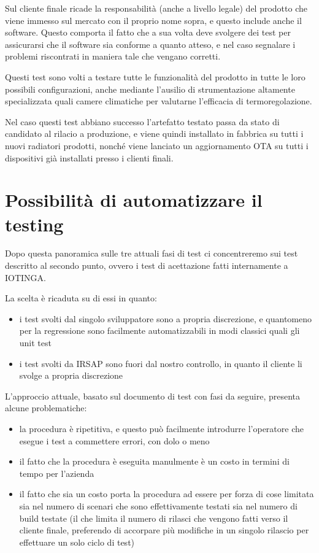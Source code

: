 \documentclass[12pt,a4paper,twoside,titlepage]{book}
\begin{document}
Sul cliente finale ricade la responsabilità (anche a livello legale) del prodotto
che viene immesso sul mercato con il proprio nome sopra, e questo include anche
il software. Questo comporta il fatto che a sua volta deve svolgere dei test per
assicurarsi che il software sia conforme a quanto atteso, e nel caso segnalare i
problemi riscontrati in maniera tale che vengano corretti.

Questi test sono volti a testare tutte le funzionalità del prodotto in tutte le loro
possibili configurazioni, anche mediante l'ausilio di strumentazione altamente
specializzata quali camere climatiche per valutarne l'efficacia di termoregolazione.

Nel caso questi test abbiano successo l'artefatto testato passa da stato di candidato
al rilacio a produzione, e viene quindi installato in fabbrica su tutti i nuovi radiatori
prodotti, nonché viene lanciato un aggiornamento OTA su tutti i dispositivi già installati
presso i clienti finali.

\section{Possibilità di automatizzare il testing}

Dopo questa panoramica sulle tre attuali fasi di test ci concentreremo sui test
descritto al secondo punto, ovvero i test di acettazione fatti internamente a IOTINGA.

La scelta è ricaduta su di essi in quanto:
\begin{itemize}
    \item i test svolti dal singolo sviluppatore sono a propria discrezione, e quantomeno
        per la regressione sono facilmente automatizzabili in modi classici quali gli unit test
    \item i test svolti da IRSAP sono fuori dal nostro controllo, in quanto il cliente
        li svolge a propria discrezione
\end{itemize}

L'approccio attuale, basato sul documento di test con fasi da seguire, presenta
alcune problematiche:
\begin{itemize}
    \item la procedura è ripetitiva, e questo può facilmente introdurre
        l'operatore che esegue i test a commettere errori, con dolo o meno
    \item il fatto che la procedura è eseguita manulmente è un costo in termini di
        tempo per l'azienda
    \item il fatto che sia un costo porta la procedura ad essere per forza di cose
        limitata sia nel numero di scenari che sono effettivamente testati sia nel
        numero di build testate (il che limita il numero di rilasci che vengono
        fatti verso il cliente finale, preferendo di accorpare più modifiche in un
        singolo rilascio per effettuare un solo ciclo di test)
\end{itemize}
\end{document}
